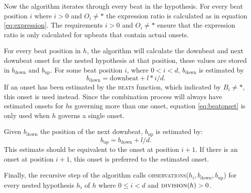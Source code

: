 Now the algorithm iterates through every beat in the hypothesis. For every beat position $i$ where $i > 0$ and $O_i \neq *$ the expression ratio is calculated as in equation \ref{eq:expression}. The requirements $i > 0$ and $O_i \neq *$ ensure that the expression ratio is only calculated for upbeats that contain actual onsets. 

For every beat position in $h$, the algorithm will calculate the downbeat and next downbeat onset for the nested hypothesis at that position, these values are stored in $b_{\mathrm{down}}$ and $b_{\mathrm{up}}$. 
For some beat position $i$, where $0 < i < d$, $b_{\mathrm{down}}$ is estimated by
\begin{equation}
\label{eq:beatonset}
b_{\mathrm{down}} = \mathrm{downbeat} + l * i/d.
\end{equation}
If an onset has been estimated by the \textsc{beats} function, which indicated by $B_i \neq *$, this onset is used instead. Since the combination process will always have estimated onsets for $h$s governing more than one onset, equation \ref{eq:beatonset} is only used when $h$ governs a single onset.

Given $b_{\mathrm{down}}$ the position of the next downbeat, $b_{\mathrm{up}}$ is estimated by:
\begin{equation}
b_{\mathrm{up}} = b_{\mathrm{down}} + l/d.
\end{equation}
This estimate should be equivalent to the onset at position $i+1$. If there is an onset at position $i+1$, this onset is preferred to the estimated onset.

Finally, the recursive step of the algorithm calls \textsc{observations}($h_i, b_{\mathrm{down}}, b_{\mathrm{up}}$) for every nested hypothesis $h_i$ of $h$ where $0 \leq i < d$ and $\textsc{division}(h) > 0$.


